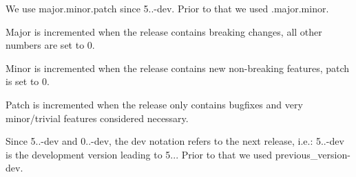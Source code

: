 We use {\ttfamily major.\+minor.\+patch} since 5..-\/dev. Prior to that we used {.\+major.\+minor}.


\begin{DoxyItemize}
\item Major is incremented when the release contains breaking changes, all other numbers are set to 0.
\item Minor is incremented when the release contains new non-\/breaking features, patch is set to 0.
\item Patch is incremented when the release only contains bugfixes and very minor/trivial features considered necessary.
\end{DoxyItemize}

Since 5..-\/dev and 0..-\/dev, the dev notation refers to the next release, i.\+e.\+: 5..-\/dev is the development version leading to 5... Prior to that we used {\ttfamily previous\+\_\+version-\/dev}. 